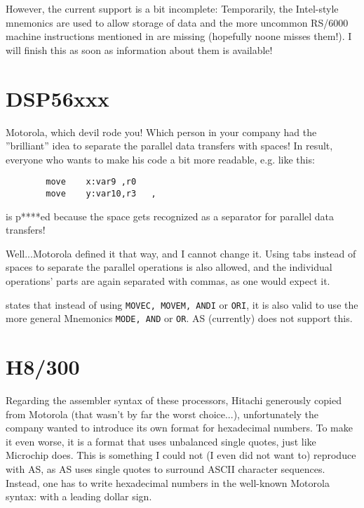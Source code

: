 \documentclass[12pt,twoside]{report}
\newcommand{\tty}[1]{{\tt #1}}
\begin{document}
However, the current support is a bit incomplete: Temporarily, the
Intel-style mnemonics are used to allow storage of data and the more
uncommon RS/6000 machine instructions mentioned in \cite{Mot601} are
missing (hopefully noone misses them!).  I will finish this as soon
as information about them is available!


\section{DSP56xxx}

Motorola, which devil rode you!  Which person in your company had the
''brilliant'' idea to separate the parallel data transfers with spaces!
In result, everyone who wants to make his code a bit more readable,
e.g. like this:
\begin{verbatim}
        move    x:var9 ,r0
        move    y:var10,r3   ,
\end{verbatim}
is p****ed because the space gets recognized as a separator for
parallel data transfers!

Well...Motorola defined it that way, and I cannot change it.  Using
tabs instead of spaces to separate the parallel operations is also
allowed, and the individual operations' parts are again separated
with commas, as one would expect it. 

\cite{Mot56} states that instead of using \tty{MOVEC, MOVEM, ANDI} or
\tty{ORI}, it is also valid to use the more general Mnemonics \tty{MODE,
AND} or \tty{OR}.
AS (currently) does not support this.


\section{H8/300}

Regarding the assembler syntax of these processors, Hitachi generously
copied from Motorola (that wasn't by far the worst choice...),
unfortunately the company wanted to introduce its own format for
hexadecimal numbers.  To make it even worse, it is a format that uses
unbalanced single quotes, just like Microchip does.  This is something I
could not (I even did not want to) reproduce with AS, as AS uses single
quotes to surround ASCII character sequences.  Instead, one has to write
hexadecimal numbers in the well-known Motorola syntax: with a leading
dollar sign.
\end{document}
